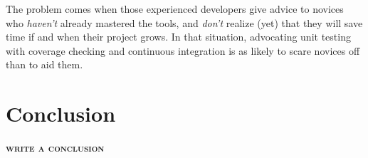 \documentclass[10pt]{article}
\newcommand{\fixme}[1]{\textsc{\textbf{#1}}}
\begin{document}
The problem comes when those experienced developers give advice to
novices who \emph{haven't} already mastered the tools, and \emph{don't}
realize (yet) that they will save time if and when their project grows.
In that situation, advocating unit testing with coverage checking and
continuous integration is as likely to scare novices off than to aid
them.

\section{Conclusion}\label{conclusion}

\fixme{write a conclusion}


\end{document}
